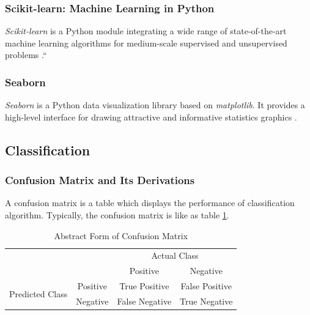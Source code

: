 \documentclass[aps, 11pt, a4paper]{article}
\begin{document}
    		\subsubsection{Scikit-learn: Machine Learning in Python}
    			\textit{Scikit-learn} is a Python module integrating a wide range of state-of-the-art machine learning algorithms for medium-scale supervised and unsupervised problems \cite{ref:sklearn1}.``
    			    			
    		\subsubsection{Seaborn}
		   		\textit{Seaborn} is a Python data visualization library based on \textit{matplotlib}. It provides a high-level interface for drawing attractive and informative statistics graphics \cite{ref:seaborn1}.
		
			\subsection{Classification}
				\subsubsection{Confusion Matrix and Its Derivations}
					A confusion matrix is a table which displays the performance of classification algorithm. Typically, the confusion matrix is like as table \ref{tb:confusion}.
					
					\begin{table}[htbp]
						\centering
						\caption{Abstract Form of Confusion Matrix}
						\label{tb:confusion}
						\begin{tabular}{cc|cc}
							\multicolumn{2}{c}{\multirow{2}{*}{}} & \multicolumn{2}{|c}{Actual Class} \\ \cline{3-4} 
							\multicolumn{2}{c|}{} & Positive & Negative \\ \hline
							\multicolumn{1}{c|}{\multirow{2}{*}{Predicted Class}} & Positive & True Positive & False Positive \\
							\multicolumn{1}{c|}{} & Negative & False Negative & True Negative
						\end{tabular}
					\end{table}
					
\end{document}
